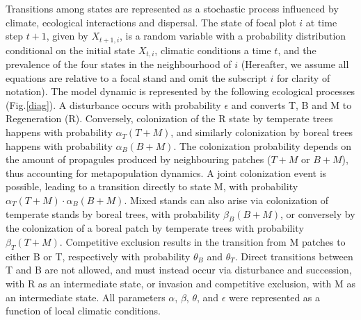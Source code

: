Transitions among states are represented as a stochastic process influenced by climate, ecological
interactions and dispersal. The state of focal plot $i$ at time step $t+1$, given by $X_{t+1,i}$, is
a random variable with a probability distribution conditional on the initial state $X_{t,i}$,
climatic conditions a time $t$, and the prevalence of the four states in the neighbourhood of $i$
(Hereafter, we assume all equations are relative to a focal stand and omit the subscript $i$ for
clarity of notation). The model dynamic is represented by the following ecological processes
(Fig.\ref{diag}). A disturbance occurs with probability $\epsilon$ and converts T, B and M to
Regeneration (R). Conversely, colonization of the R state by temperate trees happens with
probability $\alpha_T (T+M)$, and similarly colonization by boreal trees happens with probability
$\alpha_B (B+M)$. The colonization probability depends on the amount of propagules produced by
neighbouring patches ($T+M$ or $B+M$), thus accounting for metapopulation dynamics. A joint
colonization event is possible, leading to a transition directly to state M, with probability
$\alpha_T (T+M) \cdot \alpha_B (B+M)$. Mixed stands can also arise via colonization of temperate
stands by boreal trees, with probability $\beta_B (B+M)$, or conversely by the colonization of a
boreal patch by temperate trees with probability $\beta_T (T+M)$. Competitive exclusion results in
the transition from M patches to either B or T, respectively with probability $\theta_B$ and
$\theta_T$. Direct transitions between T and B are not allowed, and must instead occur via
disturbance and succession, with R as an intermediate state, or invasion and competitive exclusion,
with M as an intermediate state. All parameters $\alpha$, $\beta$, $\theta$, and $\epsilon$ were
represented as a function of local climatic conditions.

